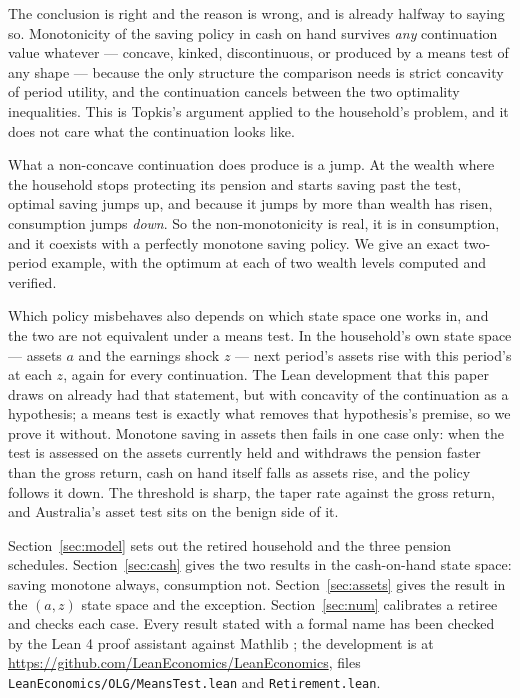 The conclusion is right and the reason is wrong, and \citet{Wellschmied2021} is already halfway to
saying so. Monotonicity of the saving policy in cash on hand
survives \emph{any} continuation value whatever --- concave, kinked, discontinuous, or produced by
a means test of any shape --- because the only structure the comparison needs is strict concavity
of period utility, and the continuation cancels between the two optimality inequalities. This is
Topkis's argument \citep{Topkis1978,MilgromShannon1994} applied to the household's problem, and it
does not care what the continuation looks like.

What a non-concave continuation does produce is a jump. At the wealth where the household stops
protecting its pension and starts saving past the test, optimal saving jumps up, and because it
jumps by more than wealth has risen, consumption jumps \emph{down}. So the non-monotonicity is
real, it is in consumption, and it coexists with a perfectly monotone saving policy. We give an
exact two-period example, with the optimum at each of two wealth levels computed and verified.

Which policy misbehaves also depends on which state space one works in, and the two are not
equivalent under a means test. In the household's own state space --- assets $a$ and the earnings
shock $z$ --- next period's assets rise with this period's at each $z$, again for every
continuation. The Lean development that this paper draws on already had that statement, but with
concavity of the continuation as a hypothesis; a means test is exactly what removes that
hypothesis's premise, so we prove it without. Monotone saving in assets then fails in one case
only: when the test is assessed on the assets currently held and withdraws the pension faster than
the gross return, cash on hand itself falls as assets rise, and the policy follows it down. The
threshold is sharp, the taper rate against the gross return, and Australia's asset test sits on
the benign side of it.

Section~\ref{sec:model} sets out the retired household and the three pension schedules.
Section~\ref{sec:cash} gives the two results in the cash-on-hand state space: saving monotone
always, consumption not. Section~\ref{sec:assets} gives the result in the $(a,z)$ state space and
the exception. Section~\ref{sec:num} calibrates a retiree and checks each case. Every result
stated with a formal name has been checked by the Lean 4 proof assistant \citep{Lean4} against
Mathlib \citep{Mathlib}; the development is at
\url{https://github.com/LeanEconomics/LeanEconomics}, files
\texttt{LeanEconomics/OLG/MeansTest.lean} and \texttt{Retirement.lean}.
